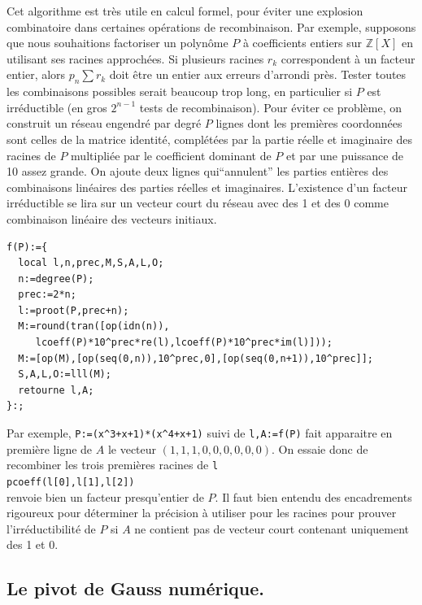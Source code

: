\documentclass[a4paper,11pt]{article}
\begin{document}
\begin{giacjshere}
Cet algorithme est tr\`es utile en calcul formel, pour \'eviter
une explosion combinatoire dans certaines
op\'erations de recombinaison. Par exemple, supposons que
nous souhaitions factoriser un polyn\^ome $P$ \`a coefficients
entiers sur $\mathbb{Z}[X]$ en utilisant ses racines approch\'ees. Si
plusieurs racines $r_k$ correspondent \`a un facteur entier,
alors $p_n \sum r_k $ doit \^etre un entier aux erreurs
d'arrondi pr\`es. Tester toutes les combinaisons possibles
serait beaucoup trop long, en particulier si $P$ est irr\'eductible
(en gros $2^{n-1}$ tests de recombinaison). Pour \'eviter ce
probl\`eme, on construit un r\'eseau engendr\'e par degr\'e $P$ 
lignes dont les premi\`eres coordonn\'ees sont celles de la
matrice identit\'e, compl\'et\'ees par la partie r\'eelle et
imaginaire des racines de $P$ multipli\'ee par le coefficient dominant
de $P$ et par une puissance de 10 assez grande. On ajoute
deux lignes qui``annulent'' les parties enti\`eres des combinaisons
lin\'eaires des parties r\'eelles et imaginaires.
L'existence
d'un facteur irr\'eductible se lira sur un vecteur court du r\'eseau
avec des 1 et des 0 comme combinaison lin\'eaire des vecteurs
initiaux.
\begin{verbatim}
f(P):={
  local l,n,prec,M,S,A,L,O;
  n:=degree(P);
  prec:=2*n;
  l:=proot(P,prec+n);
  M:=round(tran([op(idn(n)),
     lcoeff(P)*10^prec*re(l),lcoeff(P)*10^prec*im(l)]));
  M:=[op(M),[op(seq(0,n)),10^prec,0],[op(seq(0,n+1)),10^prec]];
  S,A,L,O:=lll(M);
  retourne l,A;
}:;
\end{verbatim}
Par exemple, \verb|P:=(x^3+x+1)*(x^4+x+1)| suivi de \verb|l,A:=f(P)|
fait apparaitre en premi\`ere ligne de $A$ le vecteur
$(1,1,1,0,0,0,0,0,0)$. On essaie donc de recombiner les trois
premi\`eres racines de \verb|l|\\
\verb|pcoeff(l[0],l[1],l[2])|\\
renvoie bien un facteur presqu'entier de $P$. Il faut bien entendu des
encadrements rigoureux pour d\'eterminer la pr\'ecision \`a utiliser
pour les racines pour prouver l'irr\'eductibilit\'e de $P$ si $A$ ne
contient pas de vecteur court contenant uniquement des 1 et 0.

\subsection{Le pivot de Gauss num\'erique.}

\end{giacjshere}
\end{document}
